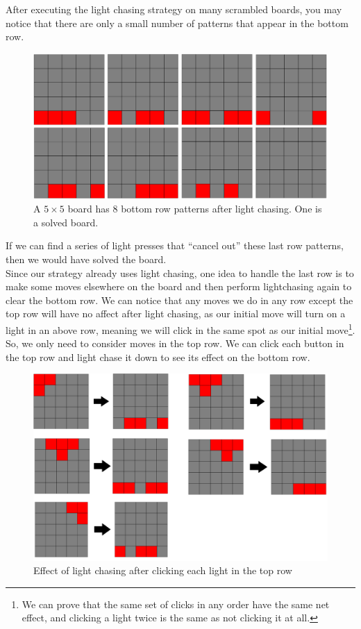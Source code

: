 \documentclass[a4paper]{article}
\begin{document}
	After executing the light chasing strategy on many scrambled boards, you may notice that there are only a small number of patterns that appear in the bottom row.
	\begin{figure}[H]
		\includegraphics[width=\textwidth]{board3.png}
		\caption{A $5 \times 5$ board has 8 bottom row patterns after light chasing. One is a solved board.}
	\end{figure}
	If we can find a series of light presses that ``cancel out'' these last row patterns, then we would have solved the board. \\
	
	Since our strategy already uses light chasing, one idea to handle the last row is to make some moves elsewhere on the board and then perform lightchasing again to clear the bottom row.
	We can notice that any moves we do in any row except the top row will have no affect after light chasing, as our initial move will turn on a light in an above row, meaning we will click in the same spot as our initial move\footnote{We can prove that the same set of clicks in any order have the same net effect, and clicking a light twice is the same as not clicking it at all.}.
	So, we only need to consider moves in the top row.
	We can click each button in the top row and light chase it down to see its effect on the bottom row.
	
	\begin{figure}[H]
		\includegraphics[width=\textwidth]{board4.png}
		\caption{Effect of light chasing after clicking each light in the top row}
	\end{figure}
\end{document}
